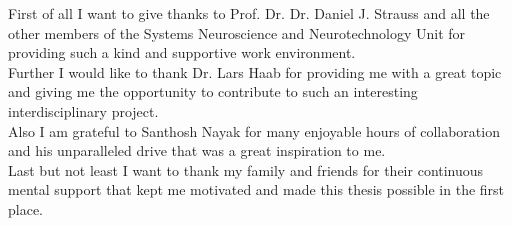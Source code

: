 
First of all I want to give thanks to Prof. Dr. Dr. Daniel J. Strauss and all the other members of the Systems Neuroscience and Neurotechnology Unit for providing such a kind and supportive work environment.\\[10pt]
Further I would like to thank Dr. Lars Haab for providing me with a great topic and giving me the opportunity to contribute to such an interesting interdisciplinary project.\\[10pt]
Also I am grateful to Santhosh Nayak for many enjoyable hours of collaboration and his unparalleled drive that was a great inspiration to me.\\[10pt]
Last but not least I want to thank my family and friends for their continuous mental support that kept me motivated and made this thesis possible in the first place. 